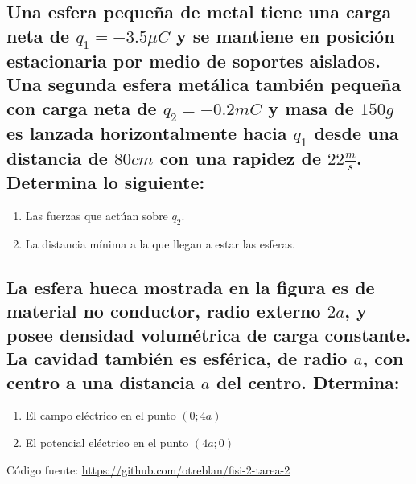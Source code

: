 \documentclass[12pt, twoside]{article}
\begin{document}
\subsection*{Una esfera pequeña de metal tiene una carga neta de $q_1 =-3.5\mu C$
y se mantiene en posición estacionaria por medio de soportes aislados.
Una segunda esfera metálica también pequeña con carga neta de $q_2 =-0.2mC$ y masa de $150g$ es
lanzada horizontalmente hacia $q_1$ desde una distancia de $80cm$ con una rapidez de
$22\frac{m}{s}$. Determina lo siguiente:}%
\begin{enumerate}[label=\textbf{\alph*)}]
	\item Las fuerzas que actúan sobre $q_2$.
	\setcounter{enumi}{2}
	\item La distancia mínima a la que llegan a estar las esferas.
\end{enumerate}

\subsection*{La esfera hueca mostrada en la figura es de material no conductor,
radio externo $2a$, y posee densidad volumétrica de carga constante.
La cavidad también es esférica, de radio $a$, con centro a una distancia
$a$ del centro. Dtermina:}%
\begin{enumerate}[label=\textbf{\alph*)}]
	\item El campo eléctrico en el punto $(0;4a)$
	\item El potencial eléctrico en el punto $(4a;0)$
\end{enumerate}

\vfill
Código fuente: \url{https://github.com/otreblan/fisi-2-tarea-2}
\end{document}

